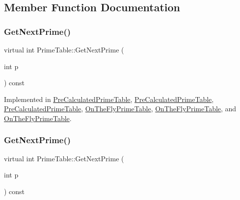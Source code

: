 \subsection{Member Function Documentation}
\mbox{\label{class_prime_table_ae537c939f56617d8937d57bbbae3ab30}} 
\subsubsection{\texorpdfstring{GetNextPrime()}{GetNextPrime()}\hspace{0.1cm}{\footnotesize\ttfamily [1/3]}}
{\footnotesize\ttfamily virtual int Prime\+Table\+::\+Get\+Next\+Prime (\begin{DoxyParamCaption}\item[{int}]{p }\end{DoxyParamCaption}) const\hspace{0.3cm}{\ttfamily [pure virtual]}}



Implemented in \mbox{\hyperlink{class_pre_calculated_prime_table_a0b99de0a790db9f0cc2b3cd4b527fd5a}{Pre\+Calculated\+Prime\+Table}}, \mbox{\hyperlink{class_pre_calculated_prime_table_a0b99de0a790db9f0cc2b3cd4b527fd5a}{Pre\+Calculated\+Prime\+Table}}, \mbox{\hyperlink{class_pre_calculated_prime_table_a0ff10b1fe13df7e56b8d7ed9f41d3998}{Pre\+Calculated\+Prime\+Table}}, \mbox{\hyperlink{class_on_the_fly_prime_table_a0f6f934f318407a812098e67584b60bf}{On\+The\+Fly\+Prime\+Table}}, \mbox{\hyperlink{class_on_the_fly_prime_table_a0f6f934f318407a812098e67584b60bf}{On\+The\+Fly\+Prime\+Table}}, and \mbox{\hyperlink{class_on_the_fly_prime_table_a5a4644fedd95d33136723f33b9302bfc}{On\+The\+Fly\+Prime\+Table}}.

\mbox{\label{class_prime_table_ae537c939f56617d8937d57bbbae3ab30}} 
\subsubsection{\texorpdfstring{GetNextPrime()}{GetNextPrime()}\hspace{0.1cm}{\footnotesize\ttfamily [2/3]}}
{\footnotesize\ttfamily virtual int Prime\+Table\+::\+Get\+Next\+Prime (\begin{DoxyParamCaption}\item[{int}]{p }\end{DoxyParamCaption}) const\hspace{0.3cm}{\ttfamily [pure virtual]}}



